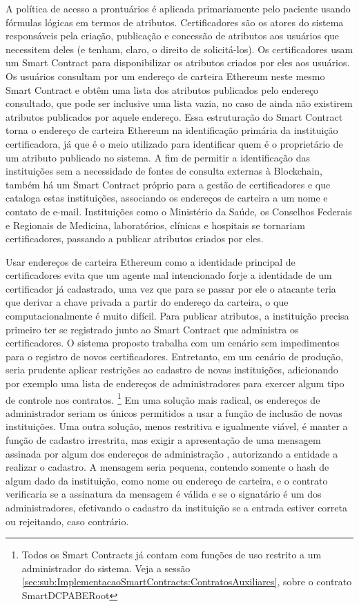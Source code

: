 \documentclass[a4paper,11pt]{article}
\begin{document}
A política de acesso a prontuários é aplicada primariamente pelo paciente usando fórmulas lógicas em termos de atributos.
Certificadores são os atores do sistema responsáveis pela criação, publicação e concessão de atributos aos usuários que necessitem deles (e tenham, claro, o direito de solicitá-los).
Os certificadores usam um Smart Contract para disponibilizar os atributos criados por eles aos usuários.
Os usuários consultam por um endereço de carteira Ethereum neste mesmo Smart Contract e obtêm uma lista dos atributos publicados pelo endereço consultado, que pode ser inclusive uma lista vazia, no caso de ainda não existirem atributos publicados por aquele endereço.
Essa estruturação do Smart Contract torna o endereço de carteira Ethereum na identificação primária da instituição certificadora, já que é o meio utilizado para identificar quem é o proprietário de um atributo publicado no sistema.
A fim de permitir a identificação das instituições sem a necessidade de fontes de consulta externas à Blockchain, também há um Smart Contract próprio para a gestão de certificadores e que cataloga estas instituições, associando os endereços de carteira a um nome e contato de e-mail. %
Instituições como o Ministério da Saúde, os Conselhos Federais e Regionais de Medicina, laboratórios, clínicas e hospitais se tornariam certificadores, passando a publicar atributos criados por eles.

Usar endereços de carteira Ethereum como a identidade principal de certificadores evita que um agente mal intencionado forje a identidade de um certificador já cadastrado, uma vez que para se passar por ele o atacante teria que derivar a chave privada a partir do endereço da carteira, o que computacionalmente é muito difícil.
Para publicar atributos, a instituição precisa primeiro ter se registrado junto ao Smart Contract que administra os certificadores.
O sistema proposto trabalha com um cenário sem impedimentos para o registro de novos certificadores.
Entretanto, em um cenário de produção, seria prudente aplicar restrições ao cadastro de novas instituições, adicionando por exemplo uma lista de endereços de administradores para exercer algum tipo de controle nos contratos.
\footnote{Todos os Smart Contracts já contam com funções de uso restrito a um administrador do sistema. Veja a sessão \ref{sec:sub:ImplementacaoSmartContracts:ContratosAuxiliares}, sobre o contrato SmartDCPABERoot}
Em uma solução mais radical, os endereços de administrador seriam os únicos permitidos a usar a função de inclusão de novas instituições.
Uma outra solução, menos restritiva e igualmente viável, é manter a função de cadastro irrestrita, mas exigir a apresentação de uma mensagem assinada por algum dos endereços de administração \cite{Marx2018}, autorizando a entidade a realizar o cadastro.
A mensagem seria pequena, contendo somente o hash de algum dado da instituição, como nome ou endereço de carteira, e o contrato verificaria se a assinatura da mensagem é válida e se o signatário é um dos administradores, efetivando o cadastro da instituição se a entrada estiver correta ou rejeitando, caso contrário.
\end{document}
